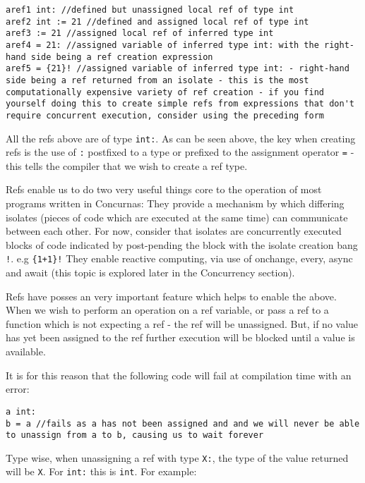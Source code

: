 \documentclass[conc-doc]{subfiles}
\begin{document}
\begin{lstlisting}
aref1 int: //defined but unassigned local ref of type int
aref2 int := 21 //defined and assigned local ref of type int
aref3 := 21 //assigned local ref of inferred type int
aref4 = 21: //assigned variable of inferred type int: with the right-hand side being a ref creation expression
aref5 = {21}! //assigned variable of inferred type int: - right-hand side being a ref returned from an isolate - this is the most computationally expensive variety of ref creation - if you find yourself doing this to create simple refs from expressions that don't require concurrent execution, consider using the preceding form
\end{lstlisting}

All the refs above are of type \lstinline{int:}. As can be seen above, the key when creating refs is the use of \lstinline{:} postfixed to a type or prefixed to the assignment operator \lstinline{=} - this tells the compiler that we wish to create a ref type.

Refs enable us to do two very useful things core to the operation of most programs written in Concurnas:
They provide a mechanism by which differing isolates (pieces of code which are executed at the same time) can communicate between each other. For now, consider that isolates are concurrently executed blocks of code indicated by post-pending the block with the isolate creation bang \lstinline{!}. e.g \lstinline!{1+1}!\lstinline{!}
They enable reactive computing, via use of onchange, every, async and await (this topic is explored later in the Concurrency section).

Refs have posses an very important feature which helps to enable the above. When we wish to perform an operation on a ref variable, or pass a ref to a function which is not expecting a ref - the ref will be unassigned. But, if no value has yet been assigned to the ref further execution will be blocked until a value is available.

It is for this reason that the following code will fail at compilation time with an error:
\begin{lstlisting}
a int:
b = a //fails as a has not been assigned and and we will never be able to unassign from a to b, causing us to wait forever 
\end{lstlisting}

Type wise, when unassigning a ref with type \lstinline{X:}, the type of the value returned will be \lstinline{X}. For \lstinline{int:} this is \lstinline{int}. For example:
\end{document}
